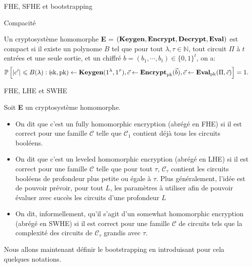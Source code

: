 \begin{section}{FHE, SFHE et bootstrapping}
\begin{definition}{Compacité}

Un cryptosystème homomorphe \textbf{E} = $(\text{\textbf{Keygen}}, \text{\textbf{Encrypt}}, \text{\textbf{Decrypt}}, \text{\textbf{Eval}})$ 
est compact si il existe un polynome $B$ tel que pour tout $\lambda, \tau
\in \mathbb{N}$, tout circuit $\Pi$ à $t$ entrées et une seule sortie, et un
chiffré $b = (b_1,\cdots,b_t) \in \{0,1\}^t$, on a:
\[ 
\mathbb{P} \left[ |c'| \leqslant B(\lambda): (\!\text{sk},\text{pk}) \leftarrow \text{\textbf{Keygen}}(1^\lambda,
1^\tau), \vec{c} \leftarrow \text{\textbf{Encrypt}}_{\text{pk}}(\vec{b}), \vec{c} \leftarrow 
\text{\textbf{Eval}}_{\text{pk}}(\Pi, \vec{c}) \right] = 1.
\]
\end{definition}

\begin{definition}{FHE, LHE et SWHE}

Soit \textbf{E} un cryptosystème homomorphe.
\begin{itemize}
\item On dit que c'est un fully homomorphic encryption (abrégé en FHE) si il est correct pour
une famille $\mathcal{C}$ telle que $\mathcal{C}_1$ contient déjà tous les
circuits booléens. 
\item On dit que c'est un  leveled homomorphic encryption (abrégé en LHE)  si il est correct pour une famille
$\mathcal{C}$ telle que pour tout $\tau$, $\mathcal{C}_\tau$ contient les circuits booléens de profondeur plus petite ou
égale à $\tau$. Plus généralement, l'idée est de pouvoir prévoir, pour tout $L$, les paramètres à utiliser afin de
pouvoir évaluer avec succès les circuits d'une profondeur $L$ 
\item On dit, informellement, qu'il s'agit d'un somewhat homomorphic encryption (abrégé en SWHE) si il est correct pour
une famille $\mathcal{C}$ de circuits tels que la complexité des circuits de $\mathcal{C}_\tau$ grandis avec $\tau$.
\end{itemize}
\end{definition}

Nous allons maintenant définir le bootstrapping en introduisant pour cela
quelques notations.


\end{section}
